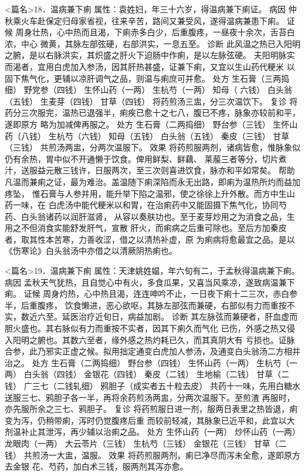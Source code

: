 \documentclass[a4paper,12pt,UTF8,twoside]{ctexbook}
\begin{document}
<篇名>18．温病兼下痢
属性：袁姓妇，年三十六岁，得温病兼下痢证。 
病因 仲秋乘火车赴保定归母家省视，往来辛苦，路间又兼受风，遂得温病兼患下痢。 
证候 周身壮热，心中热而且渴，下痢赤多白少，后重腹疼，一昼夜十余次，舌苔白浓，中心 
微黄，其脉左部弦硬，右部洪实，一息五至。 
诊断 此风温之热已入阳明之腑，是以右脉洪实，其炽盛之肝火下迫肠中作痢，是以左脉弦硬。 
夫阳明脉实而渴者，宜用白虎加入参汤，因其肝热甚盛，证兼下痢，又宜以生山药代粳米 
以固下焦气化，更辅以凉肝调气之品，则温与痢庶可并愈。 
处方 生石膏（三两捣细） 野党参（四钱） 生怀山药（一两） 生杭芍（一两） 知母（ 
六钱） 白头翁（五钱） 生麦芽（四钱） 甘草（四钱） 
将药煎汤三盅，分三次温饮下。 
复诊 将药分三次服完，温热已退强半，痢疾已愈十之七八，腹已不疼，脉象亦较前和平，遂即原方 
略为加减俾再服之。 
处方 生石膏（二两捣细） 野台参（三钱） 生怀山药（八钱） 生杭芍（六钱） 
知母（五钱） 白头翁（五钱） 秦皮（三钱） 甘草（三钱） 
共煎汤两盅，分两次温服下。 
效果 将药煎服两剂，诸病皆愈，惟脉象似仍有余热，胃中似不开通懒于饮食。俾用鲜梨、鲜藕、 
莱菔三者等分，切片煮汁，送服益元散三钱许，日服两次，至三次则喜进饮食，脉亦和平如常矣。 
帮助 凡温而兼痢之证，最为难治。盖温随下痢深陷而永无出路，即痢为温热所灼而益加疼坠， 
惟石膏与人参并用，能升举下陷之温邪，使之徐徐上升外散。而方中生山药一味，在 
白虎汤中能代粳米以和胃，在治痢药中又能固摄下焦气化，协同芍药、白头翁诸药以润肝滋肾， 
从容以奏肤功也。至于麦芽炒用之为消食之品，生用之不但消食实能舒发肝气，宣散 
肝火，而痢病之后重可除也。至后方加秦皮者，取其性本苦寒，力善收涩，借之以清热补虚，原 
为痢病将愈最宜之品。是以《伤寒论》白头翁汤中亦借之以清厥阴热痢也。 


<篇名>19．温病兼下痢
属性：天津姚姓媪，年六旬有二，于孟秋得温病兼下痢。 
病因 孟秋天气犹热，且自觉心中有火，多食瓜果，又喜当风乘凉，遂致病温兼下痢。 
证候 周身灼热，心中热且渴，连连呻吟不止，一日夜下痢十二三次，赤白参半，后重腹疼， 
饮食懒进，恶心欲呕，其脉左部弦而兼硬，右部似有力而重按不实，数近六至。延医治疗近旬日，病益加剧。 
诊断 其左脉弦而兼硬者，肝血虚而胆火盛也。其右脉似有力而重按不实者，因其下痢久而气化 
已伤，外感之热又侵入阳明之腑也。其数六至者，缘外感之热灼耗已久，而其真阴大有 
亏损也。证脉合参，此乃邪实正虚之候。拟用拙定通变白虎加人参汤，及通变白头翁汤二方相并治之。 
处方 生石膏（二两捣细） 野台参（四钱） 生怀山药（一两） 生杭芍（一两） 
白头翁（四钱） 金银花（四钱） 秦皮（二钱） 生地榆（二钱） 
甘草（二钱） 广三七（二钱轧细） 鸦胆子（成实者五十粒去皮） 
共药十一味，先用白糖水送服三七、鸦胆子各一半，再将余药煎汤两盅，分两次温服下。至煎渣 
再服时，亦先服所余之三七、鸦胆子。 
复诊 将药煎服日进一剂，服两日表里之热皆退，痢变为泻，仍稍带痢，泻时仍觉腹疼后重 
而较前轻减，其脉象已近平和，此宜以大剂温补止其泄泻，再少辅以治痢之品。 
处方 生怀山药（一两） 炒怀山药（一两） 龙眼肉（一两） 大云苓片（三钱） 
生杭芍（三钱） 金银花（三钱） 甘草（二钱） 
共煎汤一大盅，温服。 
效果 将药煎服两剂，痢已净尽而泻未全愈，遂即原方去金银 
花、芍药，加白术三钱，服两剂其泻亦愈。 
\end{document}
